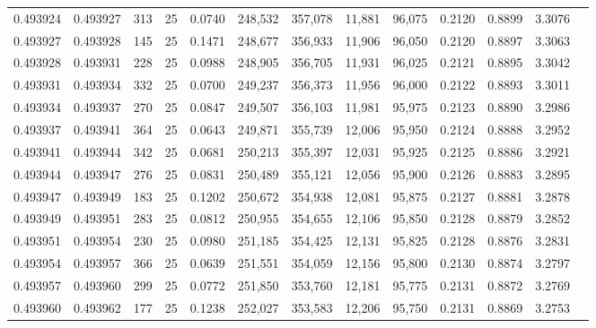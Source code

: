 \begin{tabular}{rrrrrrrrrrrrr}
0.493924 & 0.493927 &   313 &  25 &                                     0.0740 & 248,532 & 357,078 &  11,881 &  96,075 & 0.2120 & 0.8899 & 3.3076 \\
0.493927 & 0.493928 &   145 &  25 &                                     0.1471 & 248,677 & 356,933 &  11,906 &  96,050 & 0.2120 & 0.8897 & 3.3063 \\
0.493928 & 0.493931 &   228 &  25 &                                     0.0988 & 248,905 & 356,705 &  11,931 &  96,025 & 0.2121 & 0.8895 & 3.3042 \\
0.493931 & 0.493934 &   332 &  25 &                                     0.0700 & 249,237 & 356,373 &  11,956 &  96,000 & 0.2122 & 0.8893 & 3.3011 \\
0.493934 & 0.493937 &   270 &  25 &                                     0.0847 & 249,507 & 356,103 &  11,981 &  95,975 & 0.2123 & 0.8890 & 3.2986 \\
0.493937 & 0.493941 &   364 &  25 &                                     0.0643 & 249,871 & 355,739 &  12,006 &  95,950 & 0.2124 & 0.8888 & 3.2952 \\
0.493941 & 0.493944 &   342 &  25 &                                     0.0681 & 250,213 & 355,397 &  12,031 &  95,925 & 0.2125 & 0.8886 & 3.2921 \\
0.493944 & 0.493947 &   276 &  25 &                                     0.0831 & 250,489 & 355,121 &  12,056 &  95,900 & 0.2126 & 0.8883 & 3.2895 \\
0.493947 & 0.493949 &   183 &  25 &                                     0.1202 & 250,672 & 354,938 &  12,081 &  95,875 & 0.2127 & 0.8881 & 3.2878 \\
0.493949 & 0.493951 &   283 &  25 &                                     0.0812 & 250,955 & 354,655 &  12,106 &  95,850 & 0.2128 & 0.8879 & 3.2852 \\
0.493951 & 0.493954 &   230 &  25 &                                     0.0980 & 251,185 & 354,425 &  12,131 &  95,825 & 0.2128 & 0.8876 & 3.2831 \\
0.493954 & 0.493957 &   366 &  25 &                                     0.0639 & 251,551 & 354,059 &  12,156 &  95,800 & 0.2130 & 0.8874 & 3.2797 \\
0.493957 & 0.493960 &   299 &  25 &                                     0.0772 & 251,850 & 353,760 &  12,181 &  95,775 & 0.2131 & 0.8872 & 3.2769 \\
0.493960 & 0.493962 &   177 &  25 &                                     0.1238 & 252,027 & 353,583 &  12,206 &  95,750 & 0.2131 & 0.8869 & 3.2753 \\

\end{tabular}
